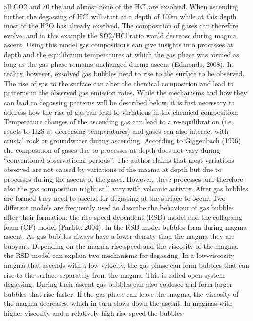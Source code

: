 \documentclass  [
  paper    = a4,
  BCOR     = 10mm,
  twoside,
  fontsize = 12pt,
  fleqn,
  toc      = bibnumbered,
  toc      = listofnumbered,
  numbers  = noendperiod,
  headings = normal,
  listof   = leveldown,
  version  = 3.03
]                                       {scrreprt}
\begin{document}
{	all CO2 and 70%
	the  and almost none of the HCl are exsolved. When ascending further the
	degassing of HCl will start at a depth of 100m while at this depth most of the
	H2O has already exsolved. The composition of gases can therefore evolve, and
	in this example the SO2/HCl ratio would decrease during magma ascent. Using
	this model gas compositions can give insights into processes at depth and the
	equilibrium temperatures at which the gas phase was formed as long as the gas
	phase remains unchanged during ascent (Edmonds, 2008).
	In reality, however, exsolved gas bubbles need to rise to the surface to be
	observed. The rise of gas to the surface can alter the chemical composition
	and lead to patterns in the observed gas emission rates. While the mechanisms
	and how they can lead to degassing patterns will be described below, it is
	first necessary to address how the rise of gas can lead to variations in the
	chemical composition: Temperature changes of the ascending gas can lead to a
	re-equilibration (i.e.,  reacts to H2S at decreasing temperatures) and gases
	can also interact with crustal rock or groundwater during ascending. According
	to Giggenbach (1996) the composition of gases due to processes at depth does
	not vary during “conventional observational periods”. The author claims that
	most variations observed are not caused by variations of the magma at depth
	but due to processes during the ascent of the gases. However, these processes
	and therefore also the gas composition might still vary with volcanic activity.
	After gas bubbles are formed they need to ascend for degassing at the surface
	to occur. Two different models are frequently used to describe the behaviour
	of gas bubbles after their formation: the rise speed dependent (RSD) model
	and the collapsing foam (CF) model (Parfitt, 2004). In the RSD model bubbles
	form during magma ascent. As gas bubbles always have a lower density than the
	magma they are buoyant. Depending on the magma rise speed and the viscosity
	of the magma, the RSD model can explain two mechanisms for degassing.
	In a low-viscosity magma that ascends with a low velocity, the gas phase can
	form bubbles that can rise to the surface separately from the magma. This is
	called open-system degassing. During their ascent gas bubbles can also coalesce
	and form larger bubbles that rise faster. If the gas phase can leave the magma,
	the viscosity of the magma decreases, which in turn slows down the ascent.
	In magmas with higher viscosity and a relatively high rise speed the bubbles
}
\end{document}

